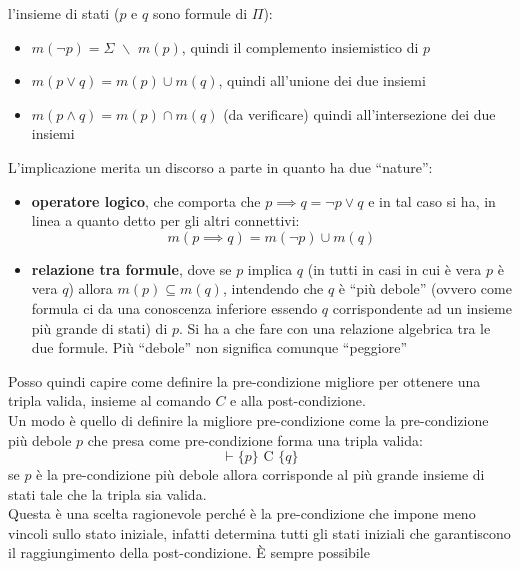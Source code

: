 				      				l'insieme di stati ($p$ e $q$ sono formule di $\Pi$): 
				      				\begin{itemize}
				      					\item $m(\neg p)=\Sigma \,\,\backslash \,\,m(p)$, quindi il complemento
				      					      insiemistico di $p$
				      					\item $m(p\lor q)=m(p)\cup m(q)$, quindi all'unione dei due insiemi  
				      					\item $m(p\land q)=m(p)\cap m(q)$ (da verificare) quindi all'intersezione dei
				      					      due insiemi
				      				\end{itemize}
				      				L'implicazione merita un discorso a parte in quanto ha due ``nature'':
				      				\begin{itemize}
				      					\item \textbf{operatore logico}, che comporta che $p\implies q= \neg p\lor q$
				      					      e in tal caso si ha, in linea a quanto detto per gli altri connettivi:
				      					      \[m(p\implies q)= m(\neg p)\cup m(q)\]
				      					\item \textbf{relazione tra formule}, dove se $p$ implica $q$ (in tutti in
				      					      casi in cui è vera $p$ è vera $q$) allora
				      					      $m(p)\subseteq m(q)$, intendendo che $q$ è ``più debole'' (ovvero come formula
				      					      ci da una conoscenza inferiore essendo $q$ corrispondente ad un insieme più
				      					      grande di stati) di $p$. Si ha a che
				      					      fare con una relazione algebrica tra le due formule. Più ``debole'' non
				      					      significa comunque ``peggiore''
				      				\end{itemize}
				      				Posso quindi capire come definire la pre-condizione migliore per ottenere una
				      				tripla valida, insieme al comando $C$ e alla post-condizione.\\
				      				Un modo è quello di definire la migliore pre-condizione come la pre-condizione più
				      				debole $p$ che presa come pre-condizione forma una tripla valida:
				      				\[\vdash \{p\}\mbox{ C }\{q\}\]
				      				se $p$ è la pre-condizione più debole allora corrisponde al più grande insieme di
				      				stati tale che la tripla sia valida.\\
				      				Questa è una scelta ragionevole perché è la pre-condizione che impone meno
				      				vincoli sullo stato iniziale, infatti determina tutti gli stati iniziali che
				      				garantiscono il raggiungimento della post-condizione. È sempre possibile
